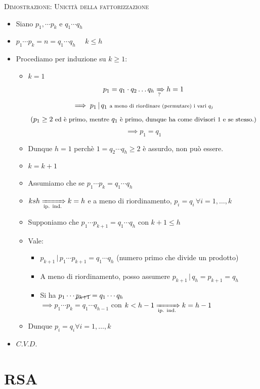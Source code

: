 \documentclass[10pt]{article}
\begin{document}
\textsc{Dimostrazione: Unicità della fattorizzazione}
\begin{itemize}
\item
Siano $p_1, \dotsb p_k$ e $q_1 \dotsb q_h$
\item
$p_1 \dotsb p_k = n = q_1 \dotsb q_h$ $\quad k \leq h$
\item
Procediamo per induzione su $k \geq 1$:
\begin{itemize}
\item
$k=1$
$$ p_1 = q_1 \cdot q_2 \dots q_h \xRightarrow[\text{?}]{} h=1$$
$$\implies p_1 \,|\, q_1 \textrm{ \scriptsize{a meno di riordinare (permutare) i vari }} \scriptstyle{q_j}$$
$$\scriptsize{\small{(p_1 \geq 2} \textrm{ ed è primo, mentre } q_1 \textrm{ è primo, dunque ha come divisori 1 e se stesso.)}} $$
$$\implies p_1 = q_1$$
\item
Dunque $h = 1$ perchè $1 = q_2 \dotsb q_h \geq 2$ è assurdo, non può essere.
\item
$k = k +1$
\item
Assumiamo che se $p_1 \dotsb p_k = q_1 \dotsb q_h$
\item
$ksh \xRightarrow[\text{ip. ind.}]{} k=h$ e a meno di riordinamento, $p_i = q_i \,\forall i = 1, \dots , k$
\item
Supponiamo che $p_1 \dotsb p_{k+1} = q_1 \dotsb q_h$ con $k + 1 \leq h$
\item
Vale:
\begin{itemize}
\item
$p_{k+1} \,|\, p_1 \dotsb p_{k+1} = q_1 \dotsb q_h$ \small{(numero primo che divide un prodotto)}
\item
A meno di riordinamento, posso assumere $p_{k+1} \,|\, q_h = p_{k+1} = q_h$
\item
Si ha $p_1 \dotsb \cancel{p_{k+1}} = q_1 \dotsb q_h$ \\
$\implies p_1 \dotsb p_k = q_1 \dotsb q_{h-1}$ con $k < h-1 \xRightarrow[\text{ip. ind.}]{} k = h-1$
\end{itemize}
\item
Dunque $p_i = q_i \forall i = 1,\dots,k$
\end{itemize}
\item
$C.V.D.$
\end{itemize}
\newpage
\section{RSA}
\end{document}
